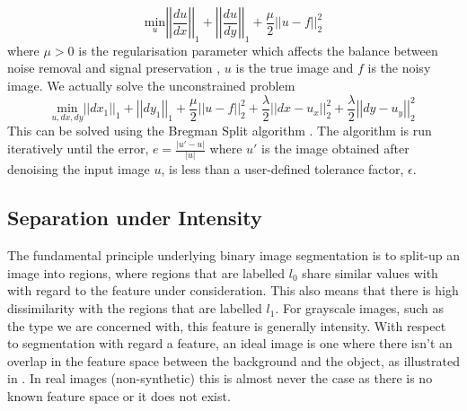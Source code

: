 \begin{definition}
	\begin{equation}
	\underset{u} {\mathrm{min}} \left| \left| \frac{du}{dx} \right| \right|_1 + \left| \left| \frac{du}{dy} \right| \right|_1 + \frac{\mu}{2} \left| \left| u-f \right| \right|^2_2
	\label{equ:anisotropic_tv_constrained}
	\end{equation}
	where $\mu > 0$ is the regularisation parameter which affects the balance between noise removal and signal preservation \citep{Getreuer2012}, $u$ is the true image and $f$ is the noisy image. We actually solve the unconstrained problem
	\begin{equation}
	\underset{u, dx, dy} {\mathrm{min}} \left| \left|dx_1 \right| \right|_1 + \left| \left| dy_1 \right| \right|_1 + \frac{\mu}{2} \left| \left| u-f \right| \right|^2_2 +
	\frac{\lambda}{2} \left| \left| dx-u_x \right| \right|^2_2 + \frac{\lambda}{2} \left| \left| dy-u_y \right| \right|^2_2
	\label{equ:anisotropic_tv_unconstrained}
	\end{equation}
	This can be solved using the Bregman Split algorithm \citep{Wei2010}.
	The algorithm is run iteratively until the error, $e = \frac{\vert u'-u \vert}{\vert u \vert}$ where $u'$ is the image obtained after denoising the input image $u$, is less than a user-defined tolerance factor, $\epsilon$. 
\end{definition}

\subsection{Separation under Intensity}
\label{sec:contrastcorrection}

The fundamental principle underlying binary image segmentation is to split-up an image into regions, where regions that are labelled $l_0$ share similar values with with regard to the feature under consideration. This also means that there is high dissimilarity with the regions that are labelled $l_1$. For grayscale images, such as the type we are concerned with, this feature is generally intensity. With respect to segmentation with regard a feature, an ideal image is one where there isn't an overlap in the feature space between the background and the object, as illustrated in . In real images (non-synthetic) this is almost never the case as there is no known feature space or it does not exist.

